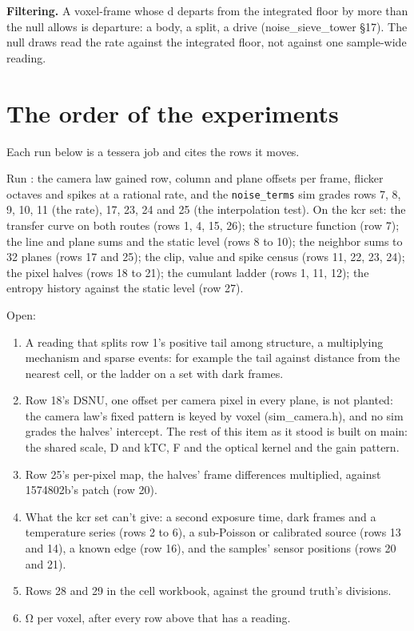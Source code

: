 \textbf{Filtering.} A voxel-frame whose d departs from the integrated floor by more than the null allows is departure: a body, a split, a drive (noise\_\allowbreak{}sieve\_\allowbreak{}tower §17). The null draws read the rate against the integrated floor, not against one sample-wide reading.

\section{\texorpdfstring{The order of the experiments}{The order of the experiments}}

Each run below is a tessera job and cites the rows it moves.

Run : the camera law gained row, column and plane offsets per frame, flicker octaves and spikes at a rational rate, and the \texttt{noise\_\allowbreak{}terms} sim grades rows 7, 8, 9, 10, 11 (the rate), 17, 23, 24 and 25 (the interpolation test). On the kcr set: the transfer curve on both routes (rows 1, 4, 15, 26); the structure function (row 7); the line and plane sums and the static level (rows 8 to 10); the neighbor sums to 32 planes (rows 17 and 25); the clip, value and spike census (rows 11, 22, 23, 24); the pixel halves (rows 18 to 21); the cumulant ladder (rows 1, 11, 12); the entropy history against the static level (row 27).

Open:

\begin{enumerate}
\item A reading that splits row 1's positive tail among structure, a multiplying mechanism and sparse events: for example the tail against distance from the nearest cell, or the ladder on a set with dark frames.
\item Row 18's DSNU, one offset per camera pixel in every plane, is not planted: the camera law's fixed pattern is keyed by voxel (sim\_\allowbreak{}camera.h), and no sim grades the halves' intercept. The rest of this item as it stood is built on main: the shared scale, D and kTC, F and the optical kernel and the gain pattern.
\item Row 25's per-pixel map, the halves' frame differences multiplied, against 1574802b's patch (row 20).
\item What the kcr set can't give: a second exposure time, dark frames and a temperature series (rows 2 to 6), a sub-Poisson or calibrated source (rows 13 and 14), a known edge (row 16), and the samples' sensor positions (rows 20 and 21).
\item Rows 28 and 29 in the cell workbook, against the ground truth's divisions.
\item Ω per voxel, after every row above that has a reading.
\end{enumerate}
